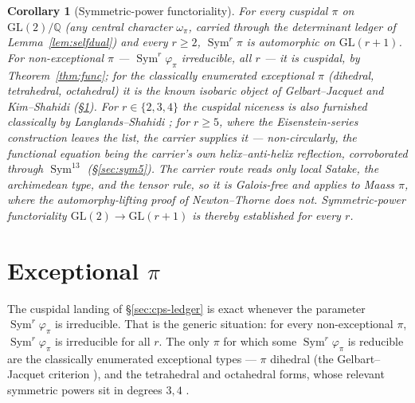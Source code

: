 \documentclass[11pt]{article}
\newtheorem{corollary}[theorem]{Corollary}
\theoremstyle{definition}
\newcommand{\Sym}{\operatorname{Sym}}
\begin{document}
\begin{corollary}[Symmetric-power functoriality]\label{cor:func234}
For every cuspidal $\pi$ on $\mathrm{GL}(2)/\mathbb Q$ (any central character $\omega_\pi$, carried through the
determinant ledger of Lemma~\ref{lem:selfdual}) and every $r\ge2$, $\Sym^r\pi$ is automorphic on
$\mathrm{GL}(r+1)$. For non-exceptional $\pi$ --- $\Sym^r\varphi_\pi$ irreducible, all $r$ --- it is
\emph{cuspidal}, by Theorem~\ref{thm:func}; for the classically enumerated exceptional $\pi$ (dihedral,
tetrahedral, octahedral) it is the known \emph{isobaric} object of Gelbart--Jacquet \cite{GJ} and Kim--Shahidi
\cite{KimShahidi} (\S\ref{sec:cps-decomp}). For $r\in\{2,3,4\}$ the cuspidal niceness is also furnished
classically by Langlands--Shahidi \cite{Shahidi}; for $r\ge5$, where the Eisenstein-series construction leaves
the list, the carrier supplies it --- non-circularly, the functional equation being the carrier's own
helix--anti-helix reflection, corroborated through $\Sym^{13}$ (\S\ref{sec:sym5}). The carrier route reads only
local Satake, the archimedean type, and the tensor rule, so it is Galois-free and applies to Maass $\pi$, where
the automorphy-lifting proof of Newton--Thorne \cite{NT} does not. Symmetric-power functoriality
$\mathrm{GL}(2)\to\mathrm{GL}(r+1)$ is thereby established for every $r$.
\end{corollary}

\section{Exceptional $\pi$}\label{sec:cps-decomp}
The cuspidal landing of \S\ref{sec:cps-ledger} is exact whenever the parameter $\Sym^r\varphi_\pi$ is
irreducible. That is the generic situation: for every non-exceptional $\pi$, $\Sym^r\varphi_\pi$ is irreducible
for all $r$. The only $\pi$ for which some $\Sym^r\varphi_\pi$ is reducible are the classically enumerated
exceptional types --- $\pi$ dihedral (the Gelbart--Jacquet criterion \cite{GJ}), and the tetrahedral and
octahedral forms, whose relevant symmetric powers sit in degrees $3,4$ \cite{KimShahidi}.
\end{document}
